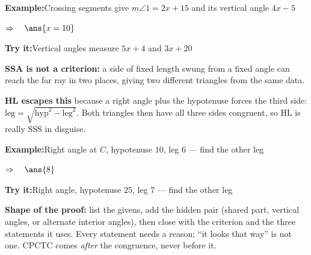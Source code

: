\documentclass[12pt]{article}
\begin{document}
\begin{examplebox}
\textbf{Example:}\quad Crossing segments give $m\angle 1 = 2x + 15$ and its vertical angle $4x - 5$

$\Rightarrow\quad \ans{x = 10}$

\end{examplebox}

\begin{tryitbox}
\textbf{Try it:}\quad Vertical angles measure $5x + 4$ and $3x + 20$\\[2pt]
\end{tryitbox}


\begin{formulabox}
\textbf{SSA is not a criterion:} a side of fixed length swung from a fixed angle can
reach the far ray in two places, giving two different triangles from the same data.\par
\textbf{HL escapes this} because a right angle plus the hypotenuse forces the third
side: $\text{leg} = \sqrt{\text{hyp}^2 - \text{leg}^2}$. Both triangles then have all
three sides congruent, so HL is really SSS in disguise.
\end{formulabox}

\begin{examplebox}
\textbf{Example:}\quad Right angle at $C$, hypotenuse $10$, leg $6$ --- find the other leg

$\Rightarrow\quad \ans{8}$

\end{examplebox}

\begin{tryitbox}
\textbf{Try it:}\quad Right angle, hypotenuse $25$, leg $7$ --- find the other leg\\[2pt]
\end{tryitbox}


\begin{formulabox}
\textbf{Shape of the proof:} list the givens, add the hidden pair (shared part,
vertical angles, or alternate interior angles), then close with the criterion and the
three statements it uses. Every statement needs a reason; ``it looks that way'' is not
one. CPCTC comes \emph{after} the congruence, never before it.
\end{formulabox}
\end{document}
